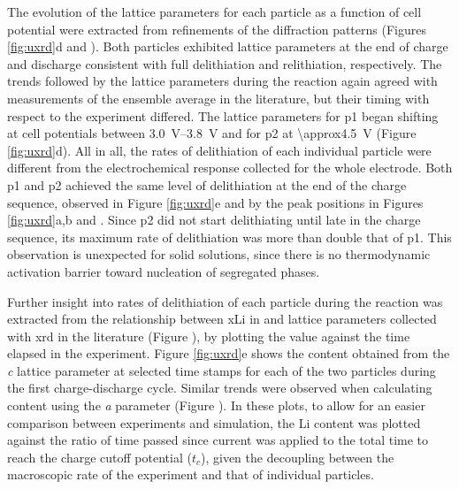 \documentclass{article}
\begin{document}
The evolution of the lattice parameters for each particle as a
function of cell potential were extracted from refinements of the
diffraction patterns (Figures \ref{fig:uxrd}d and
). Both particles exhibited lattice parameters
at the end of charge and discharge consistent with full delithiation
and relithiation, respectively\cite{novak2015}. The trends followed by
the lattice parameters during the reaction again agreed with
measurements of the ensemble average in the literature\cite{novak2015,
  faenza2018}, but their timing with respect to the experiment
differed. The lattice parameters for \gls{p1} began shifting at cell
potentials between \SIrange{3.0}{3.8}{\volt} and for \gls{p2} at
\SI{\approx4.5}{\volt} (Figure \ref{fig:uxrd}d). All in all, the rates
of delithiation of each individual particle were different from the
electrochemical response collected for the whole electrode. Both
\gls{p1} and \gls{p2} achieved the same level of delithiation at the
end of the charge sequence, observed in Figure \ref{fig:uxrd}e and by
the peak positions in Figures \ref{fig:uxrd}a,b and
. Since \gls{p2} did not start delithiating
until late in the charge sequence, its maximum rate of delithiation
was more than double that of \gls{p1}. This observation is unexpected
for solid solutions, since there is no thermodynamic activation
barrier toward nucleation of segregated phases.

\newpage %
Further insight into rates of delithiation of each particle during the
reaction was extracted from the relationship between \gls{xLi} in
 and lattice parameters collected with \gls{xrd} in the
literature\cite{robert2015} (Figure ), by
plotting the value against the time elapsed in the experiment. Figure
\ref{fig:uxrd}e shows the  content obtained from the \emph{c}
lattice parameter at selected time stamps for each of the two 
particles during the first charge-discharge cycle. Similar trends were
observed when calculating  content using the \emph{a} parameter
(Figure ). In these plots, to allow for an easier
comparison between experiments and simulation, the Li content was
plotted against the ratio of time passed since current was applied to
the total time to reach the charge cutoff potential ($t_c$), given the
decoupling between the macroscopic rate of the experiment and that of
individual particles.
\end{document}
